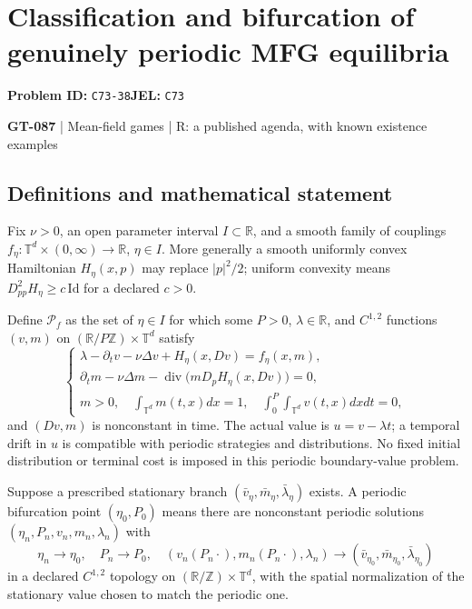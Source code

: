 \documentclass[11pt,a4paper]{article}
\begin{document}
\section*{Classification and bifurcation of genuinely periodic MFG equilibria}
\textbf{Problem ID:} \texttt{C73-38}\quad \textbf{JEL:} \texttt{C73}\par
\label{problem:OP-0217}
\label{game:GT-087}
{\sffamily\small\color{muted}
{\small\textbf{GT-087} | Mean-field games | R: a published agenda, with known existence examples\par}
\par}
\subsection*{Definitions and mathematical statement}
Fix $\nu>0$, an open parameter interval $I\subset\mathbb R$, and a smooth family of couplings $f_\eta:\mathbb T^d\times(0,\infty)\to\mathbb R$, $\eta\in I$. More generally a smooth uniformly convex Hamiltonian $H_\eta(x,p)$ may replace $|p|^2/2$; uniform convexity means $D_{pp}^2H_\eta\geq c\,\mathrm{Id}$ for a declared $c>0$.

Define $\mathcal P_f$ as the set of $\eta\in I$ for which some $P>0$, $\lambda\in\mathbb R$, and $C^{1,2}$ functions $(v,m)$ on $(\mathbb R/P\mathbb Z)\times\mathbb T^d$ satisfy
\[
 \begin{cases}
 \lambda-\partial_t v-\nu\Delta v+H_\eta(x,Dv)=f_\eta(x,m),\\
 \partial_t m-\nu\Delta m-
     \operatorname{div}\big(mD_pH_\eta(x,Dv)\big)=0,\\
 m>0,\quad\displaystyle\int_{\mathbb T^d}m(t,x)dx=1,
 \quad\displaystyle\int_0^P\int_{\mathbb T^d}v(t,x)dxdt=0,
 \end{cases}
\]
and $(Dv,m)$ is nonconstant in time. The actual value is $u=v-\lambda t$; a temporal drift in $u$ is compatible with periodic strategies and distributions. No fixed initial distribution or terminal cost is imposed in this periodic boundary-value problem.

Suppose a prescribed stationary branch $(\bar v_\eta,\bar m_\eta,\bar\lambda_\eta)$ exists. A periodic bifurcation point $(\eta_0,P_0)$ means there are nonconstant periodic solutions $(\eta_n,P_n,v_n,m_n,\lambda_n)$ with
\[
 \eta_n\to\eta_0,\quad P_n\to P_0,\quad
 (v_n(P_n\cdot),m_n(P_n\cdot),\lambda_n)
 \to(\bar v_{\eta_0},\bar m_{\eta_0},\bar\lambda_{\eta_0})
\]
in a declared $C^{1,2}$ topology on $(\mathbb R/\mathbb Z)\times\mathbb T^d$, with the spatial normalization of the stationary value chosen to match the periodic one.
\end{document}
